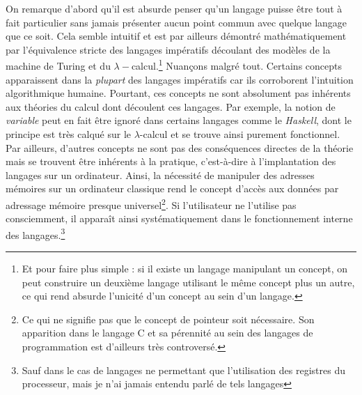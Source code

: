 \documentclass[../../main.tex]{subfiles}
\begin{document}
On remarque d'abord qu'il est absurde penser qu'un langage puisse être tout à fait particulier sans jamais présenter aucun point commun avec quelque langage que ce soit. Cela semble intuitif et est par ailleurs démontré mathématiquement par l'équivalence stricte des langages impératifs découlant des modèles de la machine de Turing et du $\lambda-$calcul.\footnote{Et pour faire plus simple : si il existe un langage manipulant un concept, on peut construire un deuxième langage utilisant le même concept plus un autre, ce qui rend absurde l'unicité d'un concept au sein d'un langage.}\newline
Nuançons malgré tout. Certains concepts apparaissent dans la \textit{plupart} des langages impératifs car ils corroborent l'intuition algorithmique humaine. Pourtant, ces concepts ne sont absolument pas inhérents aux théories du calcul dont découlent ces langages. Par exemple, la notion de \textit{variable} peut en fait être ignoré dans certains langages comme le \textit{Haskell}, dont le principe est très calqué sur le $\lambda$-calcul et se trouve ainsi purement fonctionnel. Par ailleurs, d'autres concepts ne sont pas des conséquences directes de la théorie mais se trouvent être inhérents à la pratique, c'est-à-dire à l'implantation des langages sur un ordinateur. Ainsi, la nécessité de manipuler des adresses mémoires sur un ordinateur classique rend le concept d'accès aux données par adressage mémoire presque universel\footnote{Ce qui ne signifie pas que le concept de pointeur soit nécessaire. Son apparition dans le langage C et sa pérennité au sein des langages de programmation est d'ailleurs très controversé.}. Si l'utilisateur ne l'utilise pas consciemment, il apparaît ainsi systématiquement dans le fonctionnement interne des langages.\footnote{Sauf dans le cas de langages ne permettant que l'utilisation des registres du processeur, mais je n'ai jamais entendu parlé de tels langages}

\hrulefill
\newpage
\end{document}

